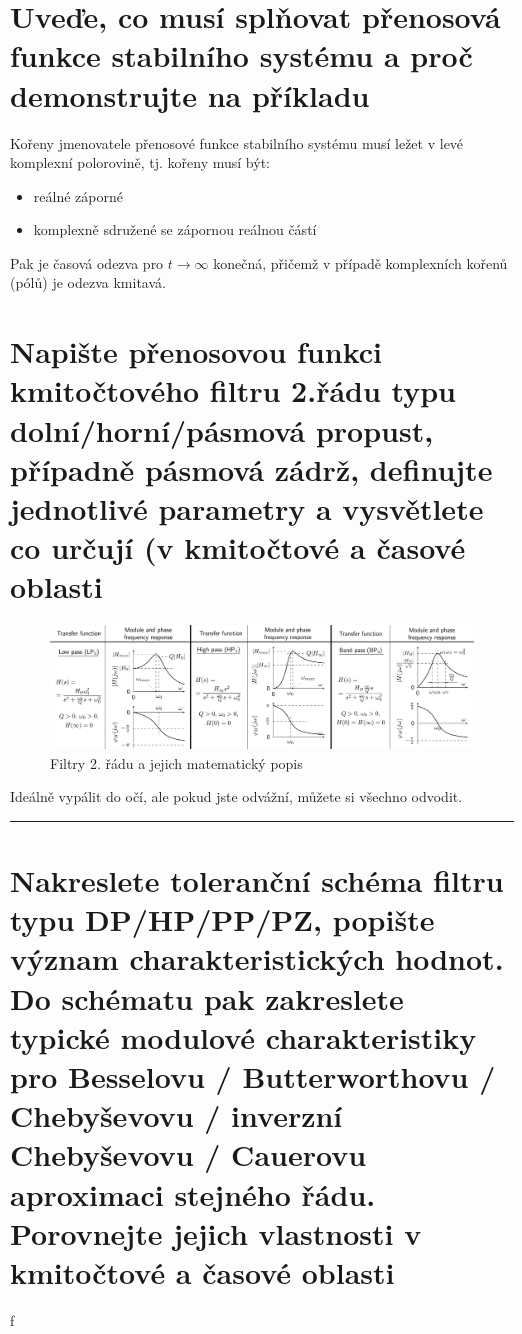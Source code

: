 \documentclass[a4paper,12pt]{article}   %
\begin{document}
\section{Uveďe, co musí splňovat přenosová funkce stabilního systému a proč demonstrujte na příkladu}
Kořeny jmenovatele přenosové funkce stabilního systému musí ležet v levé komplexní polorovině, tj. kořeny musí být:
\begin{itemize}
    \item reálné záporné
    \item komplexně sdružené se zápornou reálnou částí
\end{itemize}
Pak je časová odezva pro $t\rightarrow\infty$ konečná, přičemž v případě komplexních kořenů (pólů) je odezva kmitavá.









\section{Napište přenosovou funkci kmitočtového filtru 2.řádu typu dolní/horní/pásmová propust, případně pásmová zádrž, definujte jednotlivé parametry a vysvětlete co určují (v kmitočtové a časové oblasti}
\begin{figure}[h!]
    \centering
    \includegraphics[width=\textwidth]{filtry_2_rad.png}
    \caption{Filtry 2. řádu a jejich matematický popis}
\end{figure}
Ideálně vypálit do očí, ale pokud jste odvážní, můžete si všechno odvodit.
 \\
\hrule%









\section{Nakreslete toleranční schéma filtru typu DP/HP/PP/PZ, popište význam charakteristických hodnot. Do schématu pak zakreslete typické modulové charakteristiky pro Besselovu / Butterworthovu / Chebyševovu / inverzní Chebyševovu / Cauerovu aproximaci stejného řádu. Porovnejte jejich vlastnosti v kmitočtové a časové oblasti}
f
\end{document}
